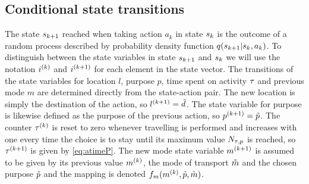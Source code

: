\subsection{Conditional state transitions}
The state $s_{k+1}$ reached when taking action $a_k$ in state $s_{k}$ is the outcome of a random process described by probability density function $q(s_{k+1}|s_{k},a_k)$. To distinguish between the state variables in state $s_{k+1}$ and $s_{k}$ we will use the notation $i^{(k)}$ and $i^{(k+1)}$ for each element in the state vector.
The transitions of the state variables for location $l$, purpose $p$, time spent on activity $\tau$ and previous mode $m$ are determined directly from the state-action pair. The new location is simply the destination of the action, so $l^{(k+1)} = \tilde{d}$. The state variable for purpose is likewise defined as the purpose of the previous action, so $p^{(k+1)} = \tilde{p}$. 
The counter $\tau^{(k)}$ is reset to zero whenever travelling is performed and increases with one every time the choice is to stay until its maximum value $N_{\tau,p}$ is reached, so $\tau^{(k+1)}$ is given by \eqref{eq:atimeP}.
The new mode state variable $m^{(k+1)}$ is assumed to be given by its previous value $m^{(k)}$, the mode of transport $\tilde{m}$ and the chosen purpose $\tilde{p}$ and the mapping is denoted $f_m(m^{(k)},\tilde{p},\tilde{m})$.

